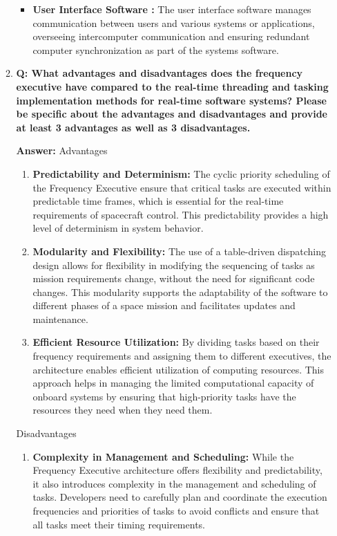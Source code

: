 \documentclass[a4paper,11pt]{article}%
\newenvironment{qanda}{\setlength{\parindent}{0pt}}{\bigskip}
\newcommand{\Q}{\bigskip\bfseries Q: }
\newcommand{\A}{\par\textbf{Answer: } \normalfont}
\begin{document}
\begin{qanda}
\begin{enumerate}
\begin{enumerate}
\begin{itemize}
					      \item \textbf{User Interface Software :} The user interface software manages communication between users and various systems or applications, overseeing intercomputer communication and ensuring redundant computer
					            synchronization as part of the systems software.
				      \end{itemize}



				\item \Q What advantages and disadvantages does the frequency executive have compared to the real-time threading and tasking implementation methods for real-time software systems?	Please be specific about the advantages and disadvantages and provide at least 3 advantages as well as 3 disadvantages.
				      \A
				      Advantages
				      \begin{enumerate}
					      \item \textbf{Predictability and Determinism:} The cyclic priority scheduling of the Frequency Executive ensure that critical tasks are executed within predictable time frames, which is essential for the real-time requirements of spacecraft control. This predictability provides a high level of determinism in system behavior.

					      \item \textbf{Modularity and Flexibility:} The use of a table-driven dispatching design allows for flexibility in modifying the sequencing of tasks as mission requirements change, without the need for significant code changes. This modularity supports the adaptability of the software to different phases of a space mission and facilitates updates and maintenance.

					      \item \textbf{Efficient Resource Utilization:} By dividing tasks based on their frequency requirements and assigning them to different executives, the architecture enables efficient utilization of computing resources. This approach helps in managing the limited computational capacity of onboard systems by ensuring that high-priority tasks have the resources they need when they need them.\\
				      \end{enumerate}

				      Disadvantages
				      \begin{enumerate}
					      \item \textbf{Complexity in Management and Scheduling:} While the Frequency Executive architecture offers flexibility and predictability, it also introduces complexity in the management and scheduling of tasks. Developers need to carefully plan and coordinate the execution frequencies and priorities of tasks to avoid conflicts and ensure that all tasks meet their timing requirements.


\end{enumerate}
\end{enumerate}
\end{enumerate}
\end{qanda}
\end{document}
